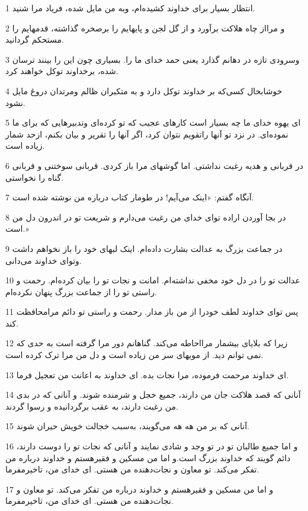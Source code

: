 \par 1 انتظار بسیار برای خداوند کشیده‌ام، وبه من مایل شده، فریاد مرا شنید.
\par 2 و مرااز چاه هلاکت برآورد و از گل لجن و پایهایم را برصخره گذاشته، قدمهایم را مستحکم گردانید.
\par 3 وسرودی تازه در دهانم گذارد یعنی حمد خدای ما را. بسیاری چون این را بینند ترسان شده، برخداوند توکل خواهند کرد.
\par 4 خوشابحال کسی‌که بر خداوند توکل دارد و به متکبران ظالم ومرتدان دروغ مایل نشود.
\par 5 ‌ای یهوه خدای ما چه بسیار است کارهای عجیب که تو کرده‌ای وتدبیرهایی که برای ما نموده‌ای. در نزد تو آنها راتقویم نتوان کرد، اگر آنها را تقریر و بیان بکنم، ازحد شمار زیاده است.
\par 6 در قربانی و هدیه رغبت نداشتی. اما گوشهای مرا باز کردی. قربانی سوختنی و قربانی گناه را نخواستی.
\par 7 آنگاه گفتم: «اینک می‌آیم! در طومار کتاب درباره من نوشته شده است.
\par 8 در بجا آوردن اراده تو‌ای خدای من رغبت می‌دارم و شریعت تو در اندرون دل من است.»
\par 9 در جماعت بزرگ به عدالت بشارت داده‌ام. اینک لبهای خود را باز نخواهم داشت وتو‌ای خداوند می‌دانی.
\par 10 عدالت تو را در دل خود مخفی نداشته‌ام. امانت و نجات تو را بیان کرده‌ام. رحمت و راستی تو را از جماعت بزرگ پنهان نکرده‌ام.
\par 11 پس تو‌ای خداوند لطف خودرا از من باز مدار. رحمت و راستی تو دائم مرامحافظت کند.
\par 12 زیرا که بلایای بیشمار مرااحاطه می‌کند. گناهانم دور مرا گرفته است به حدی که نمی توانم دید. از مویهای سر من زیاده است و دل من مرا ترک کرده است.
\par 13 ‌ای خداوند مرحمت فرموده، مرا نجات بده. ای خداوند به اعانت من تعجیل فرما.
\par 14 آنانی که قصد هلاکت جان من دارند، جمیع خجل و شرمنده شوند. و آنانی که در بدی من رغبت دارند، به عقب برگردانیده و رسوا گردند.
\par 15 آنانی که بر من هه هه می‌گویند، به‌سبب خجالت خویش حیران شوند.
\par 16 و اما جمیع طالبان تو در تو وجد و شادی نمایند و آنانی که نجات تو را دوست دارند، دائم گویند که خداوند بزرگ است.و اما من مسکین و فقیرهستم و خداوند درباره من تفکر می‌کند. تو معاون و نجات‌دهنده من هستی. ای خدای من، تاخیرمفرما.
\par 17 و اما من مسکین و فقیرهستم و خداوند درباره من تفکر می‌کند. تو معاون و نجات‌دهنده من هستی. ای خدای من، تاخیرمفرما.
 
